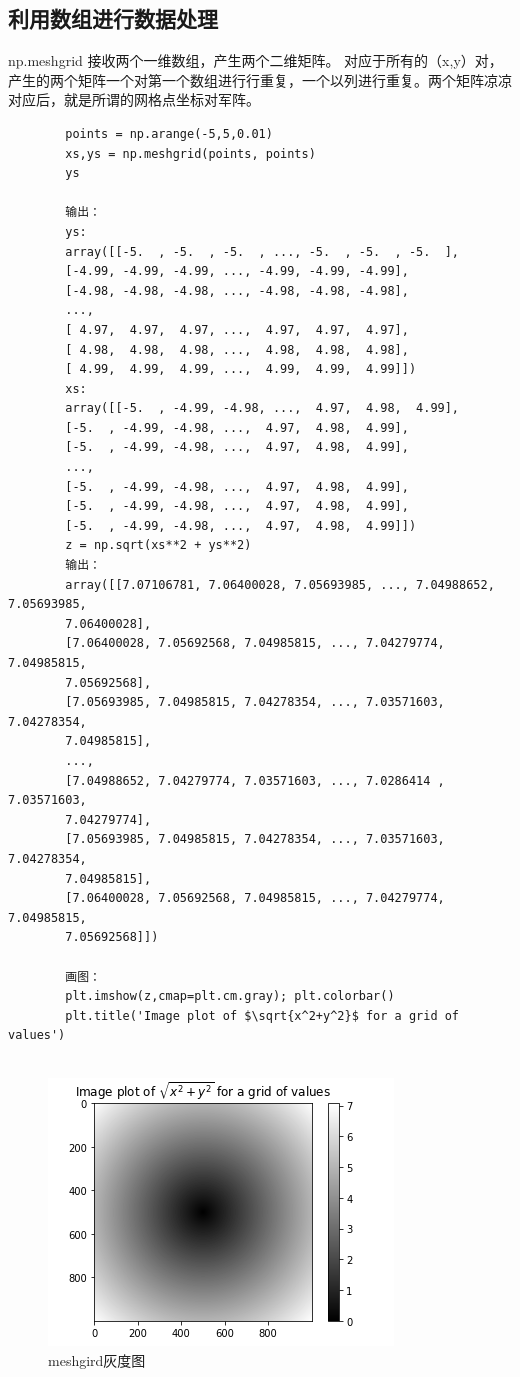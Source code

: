 \documentclass{article}
\begin{document}
	\subsection{利用数组进行数据处理}
	np.meshgrid 接收两个一维数组，产生两个二维矩阵。
	对应于所有的（x,y）对，产生的两个矩阵一个对第一个数组进行行重复，一个以列进行重复。两个矩阵凉凉对应后，就是所谓的网格点坐标对军阵。
	\begin{lstlisting}
		points = np.arange(-5,5,0.01)
		xs,ys = np.meshgrid(points, points)
		ys
		
		输出：
		ys:
		array([[-5.  , -5.  , -5.  , ..., -5.  , -5.  , -5.  ],
		[-4.99, -4.99, -4.99, ..., -4.99, -4.99, -4.99],
		[-4.98, -4.98, -4.98, ..., -4.98, -4.98, -4.98],
		...,
		[ 4.97,  4.97,  4.97, ...,  4.97,  4.97,  4.97],
		[ 4.98,  4.98,  4.98, ...,  4.98,  4.98,  4.98],
		[ 4.99,  4.99,  4.99, ...,  4.99,  4.99,  4.99]])
		xs:
		array([[-5.  , -4.99, -4.98, ...,  4.97,  4.98,  4.99],
		[-5.  , -4.99, -4.98, ...,  4.97,  4.98,  4.99],
		[-5.  , -4.99, -4.98, ...,  4.97,  4.98,  4.99],
		...,
		[-5.  , -4.99, -4.98, ...,  4.97,  4.98,  4.99],
		[-5.  , -4.99, -4.98, ...,  4.97,  4.98,  4.99],
		[-5.  , -4.99, -4.98, ...,  4.97,  4.98,  4.99]])
		z = np.sqrt(xs**2 + ys**2)
		输出：
		array([[7.07106781, 7.06400028, 7.05693985, ..., 7.04988652, 7.05693985,
		7.06400028],
		[7.06400028, 7.05692568, 7.04985815, ..., 7.04279774, 7.04985815,
		7.05692568],
		[7.05693985, 7.04985815, 7.04278354, ..., 7.03571603, 7.04278354,
		7.04985815],
		...,
		[7.04988652, 7.04279774, 7.03571603, ..., 7.0286414 , 7.03571603,
		7.04279774],
		[7.05693985, 7.04985815, 7.04278354, ..., 7.03571603, 7.04278354,
		7.04985815],
		[7.06400028, 7.05692568, 7.04985815, ..., 7.04279774, 7.04985815,
		7.05692568]])
		
		画图：
		plt.imshow(z,cmap=plt.cm.gray); plt.colorbar()
		plt.title('Image plot of $\sqrt{x^2+y^2}$ for a grid of values')
		
	\end{lstlisting}
	\begin{figure}[htbp]
		\centering
		\includegraphics[]{fig/np_3}
		\caption{meshgird灰度图}
		\label{ifg-meshgrid}
	\end{figure}
\end{document}
